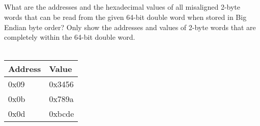 \documentclass{article}
\begin{document}
\subsection{} 
What are the addresses and the hexadecimal values of all misaligned 2-byte words that can be read from the given 64-bit double word when stored in Big Endian byte order? Only show the addresses and values of 2-byte words that are completely within the 64-bit double word. \\
\\
\begin{tabular}{|l|l|} 
\hline
Address & Value \\ 
\hline
0x09 & 0x3456 \\ \hline
0x0b & 0x789a \\ \hline
0x0d & 0xbcde \\ \hline
\end{tabular} \\\pagebreak
\end{document}
